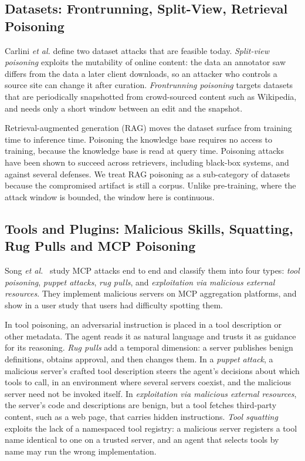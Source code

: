 \documentclass[conference]{IEEEtran}
\begin{document}
\subsection{Datasets: Frontrunning, Split-View, Retrieval Poisoning}
\label{sec:tax-datasets}

Carlini \textit{et al.} define two dataset attacks that are feasible today. \emph{Split-view poisoning} exploits the mutability of online content: the data an annotator saw differs from the data a later client downloads, so an attacker who controls a source site can change it after curation. \emph{Frontrunning poisoning} targets datasets that are periodically snapshotted from crowd-sourced content such as Wikipedia, and needs only a short window between an edit and the snapshot.

Retrieval-augmented generation (RAG) moves the dataset surface from training time to inference time. Poisoning the knowledge base requires no access to training, because the knowledge base is read at query time. Poisoning attacks have been shown to succeed across retrievers, including black-box systems, and against several defenses. We treat RAG poisoning as a sub-category of datasets because the compromised artifact is still a corpus. Unlike pre-training, where the attack window is bounded, the window here is continuous.

\subsection{Tools and Plugins: Malicious Skills, Squatting, Rug Pulls and MCP Poisoning}
\label{sec:tax-plugins}

Song \textit{et al.}~\cite{song2025} study MCP attacks end to end and classify them into four types: \emph{tool poisoning}, \emph{puppet attacks}, \emph{rug pulls}, and \emph{exploitation via malicious external resources}. They implement malicious servers on MCP aggregation platforms, and show in a user study that users had difficulty spotting them.

In tool poisoning, an adversarial instruction is placed in a tool description or other metadata. The agent reads it as natural language and trusts it as guidance for its reasoning. \emph{Rug pulls} add a temporal dimension: a server publishes benign definitions, obtains approval, and then changes them. In a \emph{puppet attack}, a malicious server's crafted tool description steers the agent's decisions about which tools to call, in an environment where several servers coexist, and the malicious server need not be invoked itself. In \emph{exploitation via malicious external resources}, the server's code and descriptions are benign, but a tool fetches third-party content, such as a web page, that carries hidden instructions. \emph{Tool squatting} exploits the lack of a namespaced tool registry: a malicious server registers a tool name identical to one on a trusted server, and an agent that selects tools by name may run the wrong implementation.
\end{document}
